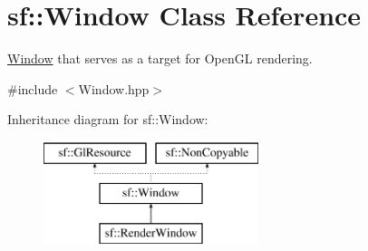 \hypertarget{classsf_1_1_window}{}\section{sf\+:\+:Window Class Reference}
\label{classsf_1_1_window}


\hyperlink{classsf_1_1_window}{Window} that serves as a target for Open\+GL rendering.  




{\ttfamily \#include $<$Window.\+hpp$>$}

Inheritance diagram for sf\+:\+:Window\+:\begin{figure}[H]
\begin{center}
\leavevmode
\includegraphics[height=3.000000cm]{classsf_1_1_window}
\end{center}
\end{figure}

